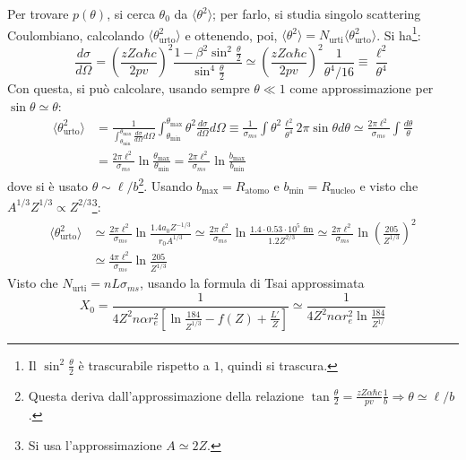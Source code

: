 \documentclass[10pt, a4paper]{scrartcl}
\numberwithin{equation}{subsection}
\theoremstyle{style1}
\begin{document}
Per trovare $p(\theta )$, si cerca $\theta _0$ da $\langle \theta ^2 \rangle$; per farlo, si studia singolo scattering Coulombiano, calcolando $\langle \theta _\text{urto}^2 \rangle$ e ottenendo, poi, $\langle \theta ^2 \rangle= N_\text{urti} \langle \theta _\text{urto}^2 \rangle$. Si ha\footnote{Il $\sin^2 \frac{\theta }{2}$ \`e trascurabile rispetto a $1$, quindi si trascura.}:
\[
\frac{d \sigma }{d \Omega }  = \left(\frac{zZ\alpha \hbar  c}{2 p v}\right) ^2 \frac{1- \beta ^2 \sin^2 \frac{\theta}{2}}{\sin ^4 \frac{\theta}{2}} \simeq \left(\frac{zZ \alpha  \hbar  c}{2pv}\right) ^2 \frac{1}{\theta ^4 / 16}\equiv \frac{\ell ^2}{\theta ^4}
\] 
Con questa, si pu\`o calcolare, usando sempre $\theta \ll 1 $ come approssimazione per $\sin \theta \simeq \theta $:
\[
\begin{split}
	\langle \theta _\text{urto}^2 \rangle &= \frac{1}{\displaystyle \int_{\theta _\text{min}} ^{\theta _\text{max}} \frac{d \sigma }{d \Omega } d\Omega }\int_{\theta _\text{min}} ^{\theta _\text{max}} \theta ^2 \frac{d \sigma }{d \Omega } d\Omega \equiv \frac{1}{\sigma _{ms} } \int \theta ^2 \frac{\ell ^2}{\theta ^4} 2\pi \sin \theta  d\theta  \simeq \frac{2\pi \ell ^2 }{\sigma _{ms} } \int \frac{d \theta }{ \theta } \\
					      &= \frac{2\pi \ell ^2}{\sigma _{ms} } \ln \frac{\theta _\text{max}}{\theta _\text{min}} = \frac{2\pi \ell ^2}{\sigma _{ms} } \ln \frac{b_\text{max}}{b_\text{min}}
\end{split}
\] 
dove si \`e usato $\theta \sim \ell  / b$\footnote{Questa deriva dall'approssimazione della relazione $\tan \frac{\theta }{2}= \frac{zZ\alpha \hbar c}{pv} \frac{1}{b}\Rightarrow \theta  \simeq \ell / b $.}. Usando $b_\text{max} = R_\text{atomo} $ e $b_\text{min} = R_\text{nucleo}$ e visto che $A^{1 / 3} Z^{1 / 3} \propto Z^{2 / 3} $\footnote{Si usa l'approssimazione $A \simeq 2Z$.}:
\[
	\begin{split}
		\langle \theta ^2_\text{urto} \rangle &\simeq \frac{2\pi \ell ^2}{\sigma _{ms} } \ln \frac{1.4 a_0 Z^{-1 /3} }{r_0 A^{1 /3 } } \simeq \frac{2\pi \ell ^2}{\sigma _{ms} } \ln \frac{1.4 \cdot  0.53 \cdot 10^{5} \text{ fm}}{1.2 Z^{2 / 3} } \simeq \frac{2\pi\ell ^2}{\sigma _{ms} } \ln \left(\frac{205}{Z^{1 / 3} }\right) ^2 \\
						      &\simeq \frac{4\pi \ell ^2}{\sigma _{ms} } \ln \frac{205}{Z^{1 /3}  } 
	\end{split}
\] 
Visto che $N_\text{urti} = nL \sigma _{ms} $, usando la formula di Tsai approssimata
\[
X_0 = \frac{1}{4Z^2 n\alpha r_e^2 \left[ \ln \frac{184}{Z^{1 / 3} } - f(Z) + \frac{L'}{Z} \right] } \simeq \frac{1}{4Z^2 n\alpha r_e^2 \ln \frac{184}{Z^{1/} }}
\] 
\end{document}
